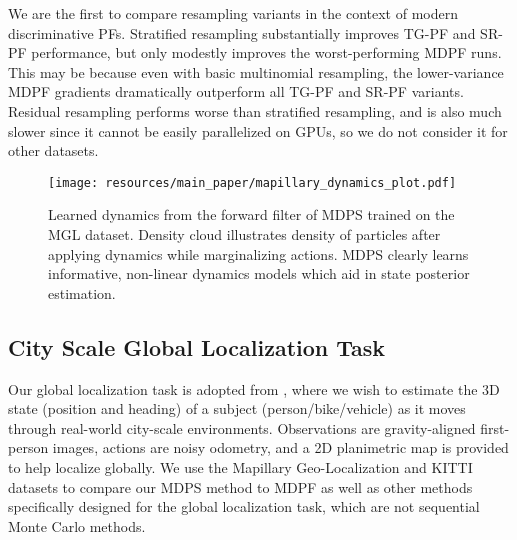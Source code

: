     We are the first to compare resampling variants in the context of modern discriminative PFs.  Stratified resampling substantially improves TG-PF and SR-PF performance, but only modestly improves the worst-performing MDPF runs.  This may be because even with basic multinomial resampling, the lower-variance MDPF gradients dramatically outperform all TG-PF and SR-PF variants.  Residual resampling performs worse than stratified resampling, and is also much slower since it cannot be easily parallelized on GPUs, so we do not consider it for other datasets.



    \begin{figure}[t]
        \centering
        \texttt{[image: resources/main\_paper/mapillary\_dynamics\_plot.pdf]}
        \vskip -0.08in
        \caption{\small{Learned dynamics from the forward filter of MDPS trained on the MGL dataset. Density cloud illustrates density of particles after applying dynamics while marginalizing actions. MDPS clearly learns informative, non-linear dynamics models which aid in state posterior estimation.}}
        \label{fig:mapillary_dynamics_plots}
        \vskip -0.1in
    \end{figure}


    
        
        
    \subsection{City Scale Global Localization Task}


        Our global localization task is adopted from \citet{sarlin2023orienternet}, where we wish to estimate the 3D  state (position and heading) of a subject (person/bike/vehicle) as it moves through real-world city-scale environments.  Observations are gravity-aligned first-person images, actions are noisy odometry, and a 2D planimetric map is provided to help localize globally. We use the Mapillary Geo-Localization \cite{sarlin2023orienternet} and KITTI \cite{Geiger2013IJRRKitti} datasets to compare our MDPS method to MDPF \cite{younis2023mdpf} as well as other methods specifically designed for the global localization task, which are not sequential Monte Carlo methods. 

